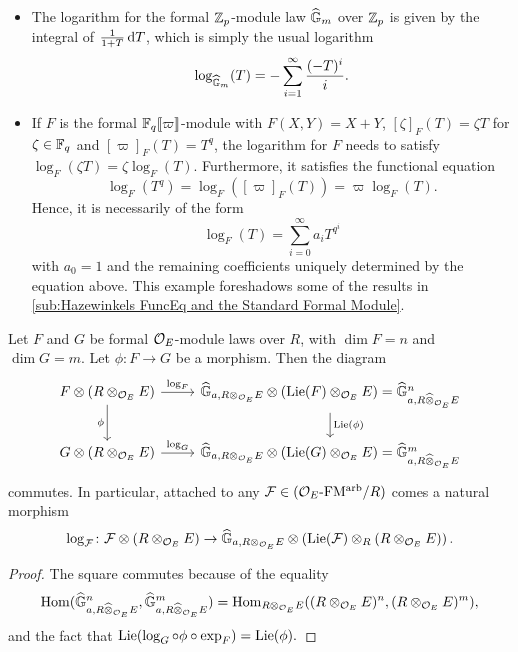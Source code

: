 \documentclass[../main.tex]{subfiles}
\begin{document}
\begin{xpl} \leavevmode
  \begin{itemize}
    \item The logarithm for the formal $\mathbb{Z}_p$-module law $\widehat{\mathbb{G}}_m$ over 
      $\mathbb{Z}_p$ is given by the integral of $\frac{1}{1+T} \, \mathrm{d} T$, which is 
      simply the usual logarithm
      \begin{equation*}
        \log_{\widehat{\mathbb{G}}_m}(T) = - \sum_{i = 1}^\infty \frac{(-T)^{i}}i. 
      \end{equation*}
    \item If $F$ is the formal $\mathbb{F}_q\llbracket \varpi \rrbracket$-module with $F(X,Y) = X+Y$,
      $[\zeta]_F(T) = \zeta T$ for $\zeta \in \mathbb{F}_q$ and $[\varpi]_F(T) = T^q$, 
      the logarithm for $F$ needs to satisfy $\log_F(\zeta T) = \zeta \log_F(T)$.
      Furthermore, it satisfies the functional equation
            \begin{equation*}
         \log_F(T^q) = \log_F([\varpi]_F(T)) = \varpi \log_F(T).
      \end{equation*}
      Hence, it is necessarily of the form
      \begin{equation*}
        \log_F(T) = \sum_{i=0}^\infty a_i T^{q^i}
      \end{equation*}
      with $a_0 = 1$ and the remaining coefficients uniquely determined by the 
      equation above.
      This example foreshadows some of the results in \cref{sub:Hazewinkels
      FuncEq and the Standard Formal Module}.
  \end{itemize}
\end{xpl}

\begin{lem}
  Let $F$ and $G$ be formal ${\mathcal{O}_E}$-module laws over $R$, with $\dim F = n$ and
  $\dim G = m$. 
  Let $\phi\colon  F \to G$ be a morphism. Then the diagram 
  \begin{equation*}
  \begin{tikzcd}[ampersand replacement=\&]
    {F \otimes(R \otimes_{\cO_E} E)} \& {\Ghat_{a, R\otimes_{\cO_E} E} \otimes (\Lie(F)}
    \otimes_{\cO_E} E) =
    \Ghat_{a, R\cotimes_{\cO_E}E}^n \\
    {G \otimes(R \otimes_{\cO_E} E)} \& {\Ghat_{a, R\otimes_{\cO_E} E} \otimes (\Lie(G)} \otimes_{\cO_E} E) =
    \Ghat_{a, R\cotimes_{\cO_E}E}^m
  	\arrow["{\log_F}", from=1-1, to=1-2]
  	\arrow["\phi"', from=1-1, to=2-1]
  	\arrow["{\Lie(\phi)}", from=1-2, to=2-2]
  	\arrow["{\log_G}", from=2-1, to=2-2]
  \end{tikzcd}
  \end{equation*}
  commutes. In particular, attached to any $\mathcal{F} \in {({\mathcal{O}_E}\textnormal-\allowbreak\mathrm{FM^{arb}}/{R})}$ comes a 
  natural morphism 
  $$\log_{\mathcal{F}}\colon  \mathcal{F} \otimes (R \otimes_{\mathcal{O}_E} E) \to \widehat{\mathbb{G}}_{a, R\otimes_{\mathcal{O}_E} E} \otimes
  \left(\operatorname{Lie}(\mathcal{F}) \otimes_R (R \otimes_{\mathcal{O}_E} E)\right).$$
  \begin{proof}
    The square commutes because of the equality
    $$\operatorname{Hom}(\widehat{\mathbb{G}}_{a, R\widehat \otimes_{\mathcal{O}_E}E}^n, \widehat{\mathbb{G}}_{a, R\widehat \otimes_{\mathcal{O}_E}E}^m) = \operatorname{Hom}_{R \otimes_{\mathcal{O}_E} E}((R\otimes_{\mathcal{O}_E} E)^n, (R\otimes_{\mathcal{O}_E} E)^m),$$
    and the fact that $\operatorname{Lie}(\log_G \circ \phi \circ \exp_F) = \operatorname{Lie}(\phi).$
  \end{proof}
\end{lem}
\end{document}
